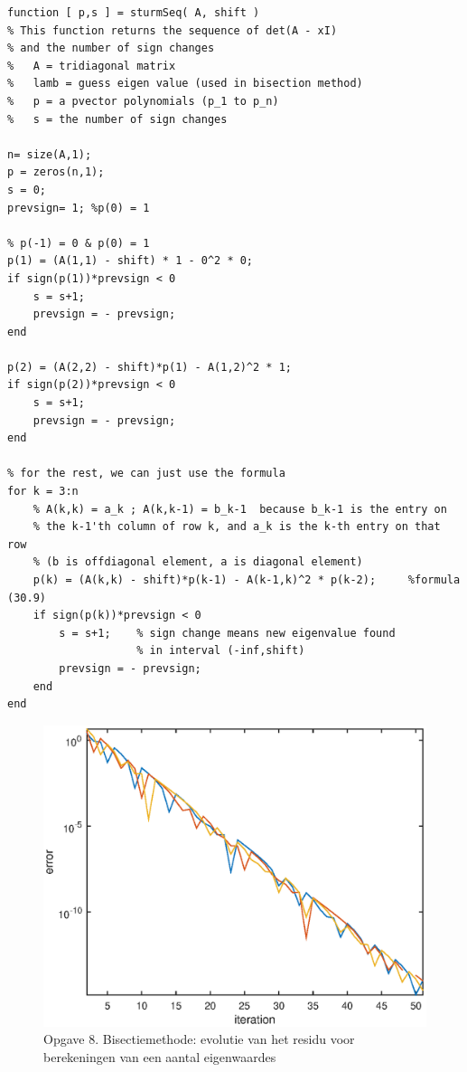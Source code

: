 \documentclass[]{article}
\begin{document}
\begin{framed}
\begin{lstlisting}
function [ p,s ] = sturmSeq( A, shift )
% This function returns the sequence of det(A - xI) 
% and the number of sign changes
%   A = tridiagonal matrix
%   lamb = guess eigen value (used in bisection method)
%   p = a pvector polynomials (p_1 to p_n)
%   s = the number of sign changes

n= size(A,1);
p = zeros(n,1);
s = 0; 
prevsign= 1; %p(0) = 1

% p(-1) = 0 & p(0) = 1
p(1) = (A(1,1) - shift) * 1 - 0^2 * 0;  
if sign(p(1))*prevsign < 0
    s = s+1; 
    prevsign = - prevsign;
end

p(2) = (A(2,2) - shift)*p(1) - A(1,2)^2 * 1;
if sign(p(2))*prevsign < 0
    s = s+1; 
    prevsign = - prevsign;
end

% for the rest, we can just use the formula
for k = 3:n
    % A(k,k) = a_k ; A(k,k-1) = b_k-1  because b_k-1 is the entry on 
    % the k-1'th column of row k, and a_k is the k-th entry on that row 
    % (b is offdiagonal element, a is diagonal element)
    p(k) = (A(k,k) - shift)*p(k-1) - A(k-1,k)^2 * p(k-2);     %formula (30.9)
    if sign(p(k))*prevsign < 0 
        s = s+1; 	% sign change means new eigenvalue found 
        			% in interval (-inf,shift)
        prevsign = - prevsign;
    end
end
\end{lstlisting}
\label{matlabSturm}
\end{framed}

\begin{figure}
\begin{center}
\includegraphics[width=1\textwidth]{opgave8.eps}
\end{center}
\caption{Opgave 8. Bisectiemethode: evolutie van het residu voor berekeningen van een aantal eigenwaardes}
\label{opgave8}
\end{figure}
\end{document}
